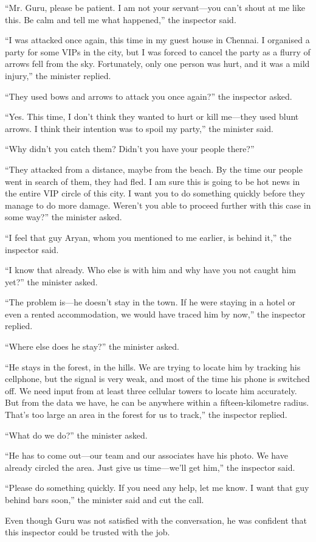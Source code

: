 “Mr. Guru, please be patient. I am not your servant—you can't shout at me like
this. Be calm and tell me what happened,” the inspector said.

“I was attacked once again, this time in my guest house in Chennai. I organised
a party for some VIPs in the city, but I was forced to cancel the party as a
flurry of arrows fell from the sky. Fortunately, only one person was hurt, and it
was a mild injury,” the minister replied.

“They used bows and arrows to attack you once again?” the inspector asked.

“Yes. This time, I don't think they wanted to hurt or kill me—they used blunt
arrows. I think their intention was to spoil my party,” the minister said.

“Why didn't you catch them? Didn't you have your people there?”

“They attacked from a distance, maybe from the beach. By the time our people
went in search of them, they had fled. I am sure this is going to be hot
news in the entire VIP circle of this city. I want you to do something quickly
before they manage to do more damage. Weren't you able to proceed further with
this case in some way?” the minister asked.

“I feel that guy Aryan, whom you mentioned to me earlier, is behind it,”
the inspector said.

“I know that already. Who else is with him and why have you not caught him yet?”
the minister asked.

“The problem is—he doesn't stay in the town. If he were staying in a hotel or
even a rented accommodation, we would have traced him by now,” the inspector
replied.

“Where else does he stay?” the minister asked.

“He stays in the forest, in the hills. We are trying to locate him by tracking
his cellphone, but the signal is very weak, and most of the time his phone is
switched off. We need input from at least three cellular towers to locate him
accurately. But from the data we have, he can be anywhere within a
fifteen-kilometre radius. That's too large an area in the forest for us to
track,” the inspector replied.

“What do we do?” the minister asked.

“He has to come out—our team and our associates have his photo. We have
already circled the area. Just give us time—we'll get him,” the inspector
said.

“Please do something quickly. If you need any help, let me know. I want that guy
behind bars soon,” the minister said and cut the call.

Even though Guru was not satisfied with the conversation, he was confident that
this inspector could be trusted with the job.